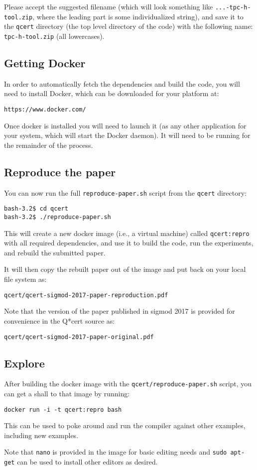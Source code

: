 \documentclass[acmsmall]{acmart}
\begin{document}
Please accept the suggested filename (which will look something like
\verb+...-tpc-h-tool.zip+, where the leading part is some
individualized string), and save it to the \verb+qcert+ directory (the
top level directory of the code) with the following name:
\verb+tpc-h-tool.zip+ (all lowercases).

\subsection*{Getting Docker}

In order to automatically fetch the dependencies and build the code,
you will need to install Docker, which can be downloaded for your platform at:
\begin{verbatim}
https://www.docker.com/
\end{verbatim}

Once docker is installed you will need to launch it (as any other
application for your system, which will start the Docker daemon). It
will need to be running for the remainder of the process.

\subsection*{Reproduce the paper}

You can now run the full \verb+reproduce-paper.sh+ script from the
\verb+qcert+ directory:
\begin{verbatim}
bash-3.2$ cd qcert
bash-3.2$ ./reproduce-paper.sh 
\end{verbatim}

This will create a new docker image (i.e., a virtual
machine) called \verb+qcert:repro+ with all required dependencies, and
use it to build the code, run the experiments, and rebuild the
submitted paper.

It will then copy the rebuilt paper out of the image and put back on
your local file system as:
\begin{verbatim}
qcert/qcert-sigmod-2017-paper-reproduction.pdf
\end{verbatim}

Note that the version of the paper published in sigmod 2017 is
provided for convenience in the Q*cert source as:
\begin{verbatim}
qcert/qcert-sigmod-2017-paper-original.pdf
\end{verbatim}

\subsection*{Explore}

After building the docker image with the
\verb+qcert/reproduce-paper.sh+ script, you can get a shall to that image by running:

\begin{verbatim}
docker run -i -t qcert:repro bash
\end{verbatim}

This can be used to poke around and run the compiler against other
examples, including new examples.

Note that \verb+nano+ is provided in the image for basic editing needs
and \verb+sudo apt-get+ can be used to install other editors as
desired.
\end{document}
